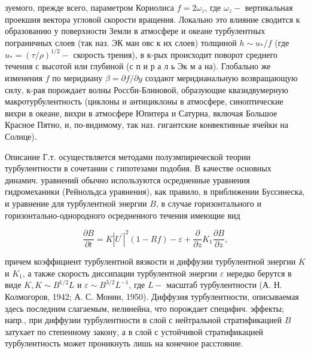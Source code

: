\documentclass[10pt]{article}
\begin{document}
зуемого, прежде всего, параметром Кориолиса $f=2 \omega_{z}$, где $\omega_{z}-$ вертикальная проекшия вектора угловой скорости вращения. Локально это влияние сводится к образованию у поверхности Земли в атмосфере и океане турбулентных пограничных слоев (так наз. ЭК ман овс к их слоев) толщиной $h \sim u_{*} / f$ (где $u_{*}=(\tau / \rho)^{1 / 2}-$ скорость трения), в к-рых происходит поворот среднего течения с высотой или глубиной (с п и р а л ь Эк м а на). Глобально же изменения $f$ по меридиану $\beta=\partial f / \partial y$ создают меридианальную возвращающую силу, к-рая порождает волны Россби-Блиновой, образующие квазидвумерную макротурбулентность (циклоны и антициклоны в атмосфере, синоптические вихри в океане, вихри в атмосфере Юпитера и Сатурна, включая Большое Красное Пятно, и, по-видимому, так наз. гигантские конвективные ячейки на Солнце).



Описание Г.т. осуществляется методами полуэмпирической теории турбулентности в сочетании с гипотезами подобия. В качестве основных динамич. уравнений обычно используются осредненные уравнения гидромеханики (Рейнольдса уравнения), как правило, в приближении Буссинеска, и уравнение для турбулентной энергии $B$, в случае горизонтального и горизонтально-однородного осредненного течения имеющие вид



\[

\frac{\partial B}{\partial t}=K\left|U^{\prime}\right|^{2}(1-R f)-\varepsilon+\frac{\partial}{\partial z} K_{1} \frac{\partial B}{\partial z},

\]



причем коэффициент турбулентной вязкости и диффузии турбулентной энергии $K$ и $K_{1}$, а также скорость диссипации турбулентной энергии $\varepsilon$ нередко берутся в виде $K, K \sim B^{1 / 2} L$ и $\varepsilon \sim B^{3 / 2} L^{-1}$, где $L-$ масштаб турбулентности (А. Н. Колмогоров, 1942; А. С. Монин, 1950). Диффузия турбулентности, описываемая здесь последним слагаемым, нелинейна, что порождает специфич. эффекты; напр., при диффузии турбулентности в слой с нейтральной стратификацией $B$ затухает по степенному закону, а в слой с устойчивой стратификацией турбулентность может проникнуть лишь на конечное расстояние.
\end{document}
